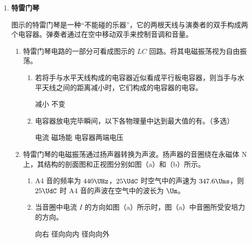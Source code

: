\documentclass[\gkver]{gaokaozhenti}
\begin{document}
\begin{enumerate}
{（2）物块克服重力做功的瞬时功率

$P=mgv_{1}\sin 60^{\circ}=0.5\times 9.8\times 5.5\times\frac{\sqrt{3}}{2} \UW\approx 23.3 \UW$
}

\item
\textbf{特雷门琴}

图示的特雷门琴是一种“不能碰的乐器”，它的两根天线与演奏者的双手构成两个电容器。弹奏者通过在空中移动双手来控制音调和音量。

\onepicture[h=3.2cm, align=right]{}
\begin{enumerate}
	\item
	特雷门琴电路的一部分可看成图示的 $LC$ 回路。将其电磁振荡视为自由振荡。

	\onepicture[h=2.2cm, align=right]{}

	\begin{enumerate}
		\item
		若将手与水平天线构成的电容器近似看成平行板电容器，则当手与水平天线之间的距离减小时，它们构成的电容器的电容。

		{减小}
		{不变}

		\item
		电容器放电完毕瞬间，以下各物理量中达到最大值的有。（多选）

		{电流}
		{磁场能}
		{电容器两端电压}
	\end{enumerate}

	\item
	特雷门琴的电磁振荡通过扬声器转换为声波。扬声器的音圈绕在永磁体 N 上，其结构的剖面图和正视图分别如图（a）和（b）所示。


	\begin{enumerate}
		\item
		A4 音的频率为 $440 \UHz$，$25\UdC$ 时空气中的声速为 $347.6 \Ums$，则 $25\UdC$ 时 A4 音的声波在空气中的波长为 $\Um$。

		\item
		当音圈中电流 $I$ 的方向如图（a）所示时，图（a）中音圈所受安培力的方向。

		{向右}
		{径向向内}
		{径向向外}


\end{enumerate}
\end{enumerate}
\end{enumerate}
\end{document}
